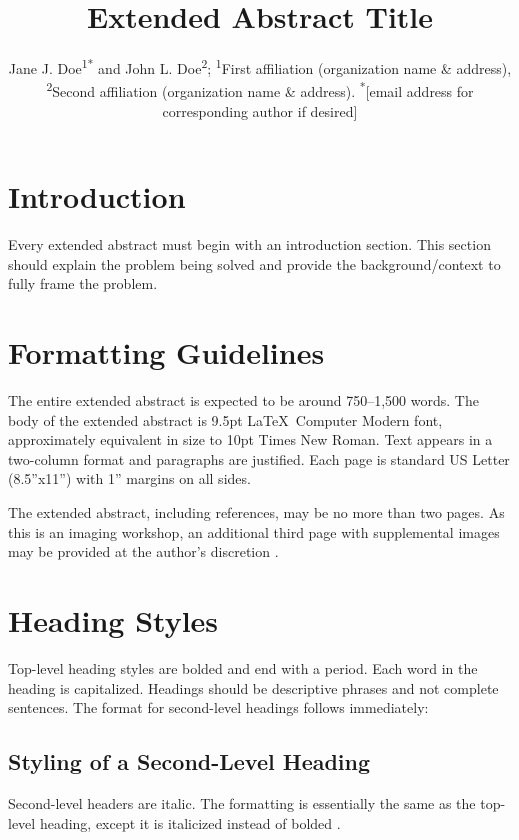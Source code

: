 \documentclass{RPI-SIW}
\author{
	Jane J. Doe\textsuperscript{1}\textsuperscript{*}
	and 
	John L. Doe\textsuperscript{2};
	\textsuperscript{1}First affiliation (organization name \& address),
	\textsuperscript{2}Second affiliation (organization name \& address).
	\textsuperscript{*}[email address for corresponding author if desired]
}
\title{Extended Abstract Title}
\begin{document}
\maketitle


\section*{Introduction}
Every extended abstract must begin with an introduction section. This section should explain the problem being solved and provide the background/context to fully frame the problem.

\section*{Formatting Guidelines}
The entire extended abstract is expected to be around 750--1,500 words.  The body of the extended abstract is 9.5pt \LaTeX\ Computer Modern font, approximately equivalent in size to 10pt Times New Roman. Text appears in a two-column format and paragraphs are justified. Each page is standard US Letter (8.5''x11'') with 1'' margins on all sides.

The extended abstract, including references, may be no more than two pages. As this is an imaging workshop, an additional third page with supplemental images may be provided at the author’s discretion \cite{christian2012}.

\section*{Heading Styles}
Top-level heading styles are bolded and end with a period. Each word in the heading is capitalized. Headings should be descriptive phrases and not complete sentences. The format for second-level headings follows immediately:

\subsection*{Styling of a Second-Level Heading}
Second-level headers are italic. The formatting is essentially the same as the top-level heading, except it is italicized instead of bolded \cite{owen2008}.
\end{document}
